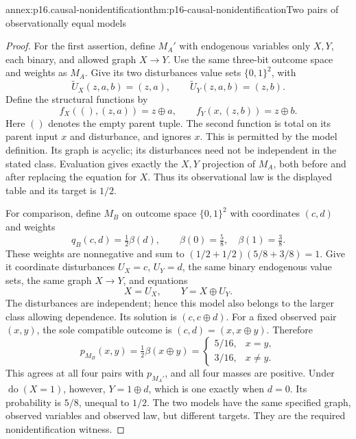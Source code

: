 \begin{annexitem}{annex:p16.causal-nonidentification}{thm:p16-causal-nonidentification}{Two pairs of observationally equal models}
\begin{proof}
For the first assertion, define \(M_A'\) with endogenous variables
only \(X,Y\), each binary, and allowed graph \(X\to Y\).
Use the same three-bit outcome space and weights as \(M_A\).
Give its two disturbances value sets \(\{0,1\}^2\), with
\[
 \widetilde U_X(z,a,b)=(z,a),\qquad
 \widetilde U_Y(z,a,b)=(z,b).
\]
Define the structural functions by
\[
 f_X((),(z,a))=z\oplus a,\qquad
 f_Y(x,(z,b))=z\oplus b.
\]
Here \(()\) denotes the empty parent tuple. The second function is
total on its parent input \(x\) and disturbance, and ignores \(x\).
This is permitted by the model definition. Its graph is acyclic; its
disturbances need not be independent in the stated class. Evaluation
gives exactly the \(X,Y\) projection of \(M_A\), both before and
after replacing the equation for \(X\). Thus its observational law
is the displayed table and its target is \(1/2\).

For comparison, define \(M_B\) on outcome space \(\{0,1\}^2\)
with coordinates \((c,d)\) and weights
\[
 q_B(c,d)=\tfrac12\beta(d),\qquad
 \beta(0)=\tfrac58,\quad\beta(1)=\tfrac38.
\]
These weights are nonnegative and sum to
\((1/2+1/2)(5/8+3/8)=1\). Give it coordinate disturbances
\(U_X=c\), \(U_Y=d\), the same binary endogenous value sets,
the same graph \(X\to Y\), and equations
\[
 X=U_X,\qquad Y=X\oplus U_Y.
\]
The disturbances are independent; hence this model also belongs to the
larger class allowing dependence. Its solution is \((c,c\oplus d)\).
For a fixed observed pair \((x,y)\), the sole compatible outcome
is \((c,d)=(x,x\oplus y)\). Therefore
\[
 p_{M_B}(x,y)=\tfrac12\beta(x\oplus y)
  =\begin{cases}5/16,&x=y,\\3/16,&x\ne y.\end{cases}
\]
This agrees at all four pairs with \(p_{M_A'}\), and all four
masses are positive. Under \(\operatorname{do}(X=1)\), however,
\(Y=1\oplus d\), which is one exactly when \(d=0\). Its
probability is \(5/8\), unequal to \(1/2\). The two models
have the same specified graph, observed variables and observed law, but
different targets. They are the required nonidentification witness.


\end{proof}
\end{annexitem}
